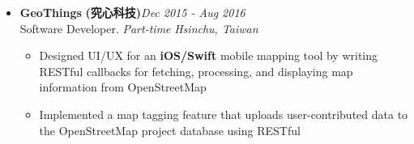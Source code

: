\begin{itemize}[leftmargin=0pt, label={}]
\item{
{\sectionheading\large{\textbf{GeoThings}}} \textbf{(究心科技)}\hfill {\sectionheading\small{\textit{Dec 2015 - Aug 2016}}}\\
{\sectionheading\small{Software Developer. \textit{Part-time}}}\hfill
{\sectionheading\small{\textit{Hsinchu, Taiwan}}}

    \vspace{-6pt}
    \begin{itemize}[label=\textbullet, leftmargin=*, noitemsep]%
        \item{Designed UI/UX for an \textbf{iOS/Swift} mobile mapping tool by writing RESTful callbacks for fetching, processing, and displaying map information from OpenStreetMap}
        \item{Implemented a map tagging feature that uploads user-contributed data to the OpenStreetMap project database using RESTful}
    \end{itemize}
}
\end{itemize}
